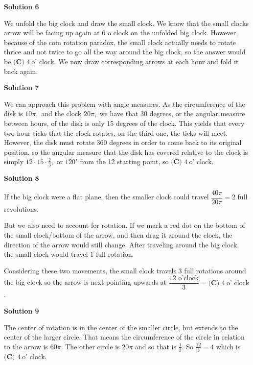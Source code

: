 \begin{enumerate}
\textbf{Solution 6}

We unfold the big clock and draw the small clock. We know that the small clocks arrow will be facing up again at 6 o clock on the unfolded big clock. However, because of the coin rotation paradox, the small clock actually needs to rotate thrice and not twice to go all the way around the big clock, so the answer would be $\boxed{\textbf{(C) }4 \ \text{o' clock}}$. We now draw corresponding arrows at each hour and fold it back again.

 



\textbf{Solution 7}

We can approach this problem with angle measures. As the circumference of the disk is $10\pi,$ and the clock $20 \pi,$ we have that 30 degrees, or the angular measure between hours, of the disk is only 15 degrees of the clock. This yields that every two hour ticks that the clock rotates, on the third one, the ticks will meet. However, the disk must rotate 360 degrees in order to come back to its original position, so the angular measure that the disk has covered relative to the clock is simply $12 \cdot 15 \cdot \frac{2}{3},$ or $120^\circ$ from the 12 starting point, so $\boxed{\textbf{(C) }4 \ \text{o' clock}}$.

 



\textbf{Solution 8}

If the big clock were a flat plane, then the smaller clock could travel $\dfrac{40\pi}{20\pi}=2$ full revolutions.

 But we also need to account for rotation. If we mark a red dot on the bottom of the small clock/bottom of the arrow, and then drag it around the clock, the direction of the arrow would still change. After traveling around the big clock, the small clock would travel $1$ full rotation.

 Considering these two movements, the small clock travels 3 full rotations around the big clock so the arrow is next pointing upwards at $\dfrac{12 \text{ o'clock}}{3}=\boxed{\textbf{(C) }4 \ \text{o' clock}}$.

 



\textbf{Solution 9}

The center of rotation is in the center of the smaller circle, but extends to the center of the larger circle. That means the circumference of the circle in relation to the arrow is $60 \pi$. The other circle is $20 \pi$ and so that is $\frac{1}{3}$. So $\frac{12}{3} = 4$ which is $\boxed{\textbf{(C) }4 \ \text{o' clock}}$.


\end{enumerate}
